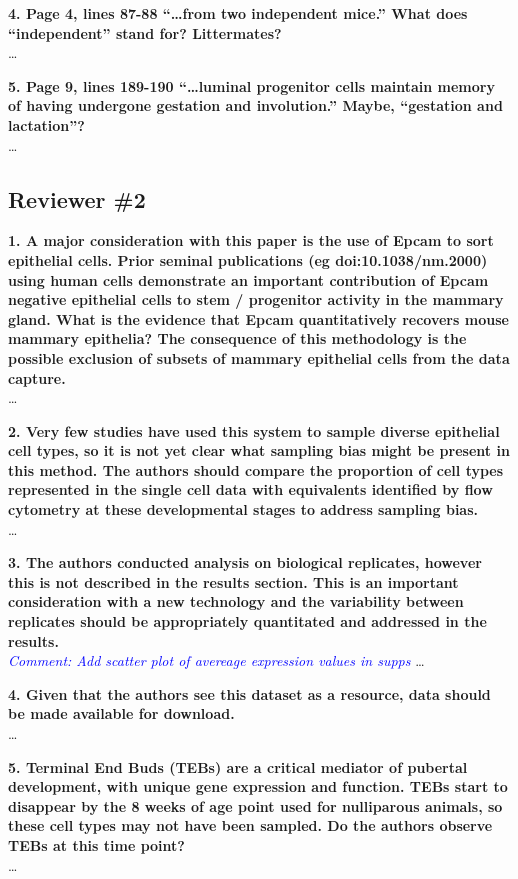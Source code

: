 \documentclass{article}
\newcommand{\comment}[1]{\textit{\textcolor{blue}{Comment: #1}}}
\begin{document}
\textbf{4. Page 4, lines 87-88 “…from two independent mice.” What does “independent” stand for? Littermates?}\\
\ldots

\textbf{5. Page 9, lines 189-190 “…luminal progenitor cells maintain memory of having undergone gestation and involution.” Maybe, “gestation and lactation”?}\\
\ldots

\subsection*{Reviewer \#2}
\textbf{1. A major consideration with this paper is the use of Epcam to sort epithelial cells. Prior seminal publications (eg doi:10.1038/nm.2000) using human cells demonstrate an important contribution of Epcam negative epithelial cells to stem / progenitor activity in the mammary gland. What is the evidence that Epcam quantitatively recovers mouse mammary epithelia? The consequence of this methodology is the possible exclusion of subsets of mammary epithelial cells from the data capture.}\\
\ldots

\textbf{2. Very few studies have used this system to sample diverse epithelial cell types, so it is not yet clear what sampling bias might be present in this method. The authors should compare the proportion of cell types represented in the single cell data with equivalents identified by flow cytometry at these developmental stages to address sampling bias.}\\
\ldots

\textbf{3. The authors conducted analysis on biological replicates, however this is not described in the results section. This is an important consideration with a new technology and the variability between replicates should be appropriately quantitated and addressed in the results.}\\
\comment{Add scatter plot of avereage expression values in supps}
\ldots

\textbf{4. Given that the authors see this dataset as a resource, data should be made available for download.}\\
\ldots

\textbf{5. Terminal End Buds (TEBs) are a critical mediator of pubertal development, with unique gene expression and function. TEBs start to disappear by the 8 weeks of age point used for nulliparous animals, so these cell types may not have been sampled. Do the authors observe TEBs at this time point?}\\
\ldots
\end{document}
